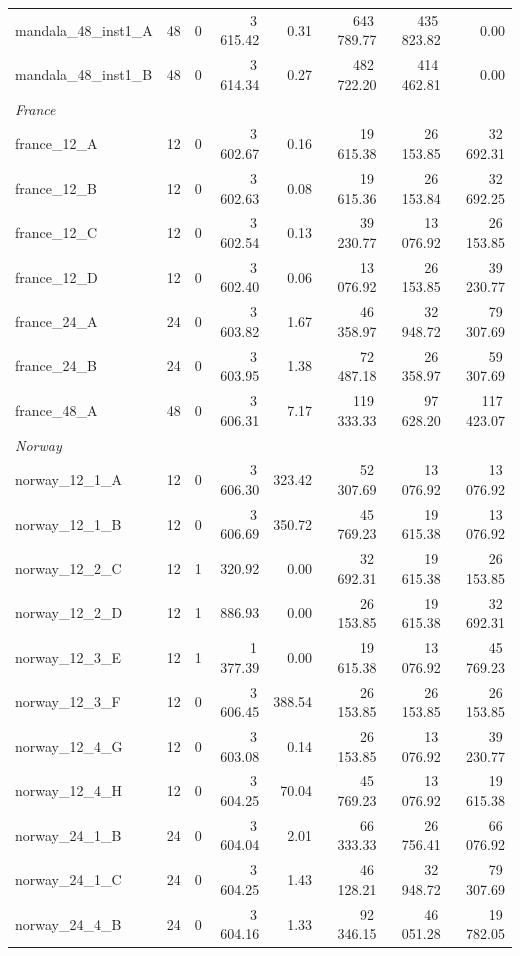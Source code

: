\documentclass{article}
\begin{document}
\begin{table}[h!]
\begin{tabular}{@{}l r c r r r r r@{}}
mandala\_48\_inst1\_A & 48 & 0 & 3\,615.42 & 0.31 & 643\,789.77 & 435\,823.82 & 0.00 \\
mandala\_48\_inst1\_B & 48 & 0 & 3\,614.34 & 0.27 & 482\,722.20 & 414\,462.81 & 0.00 \\
\midrule
\multicolumn{8}{l}{\textit{France}} \\
\midrule
france\_12\_A & 12 & 0 & 3\,602.67 & 0.16 & 19\,615.38 & 26\,153.85 & 32\,692.31 \\
france\_12\_B & 12 & 0 & 3\,602.63 & 0.08 & 19\,615.36 & 26\,153.84 & 32\,692.25 \\
france\_12\_C & 12 & 0 & 3\,602.54 & 0.13 & 39\,230.77 & 13\,076.92 & 26\,153.85 \\
france\_12\_D & 12 & 0 & 3\,602.40 & 0.06 & 13\,076.92 & 26\,153.85 & 39\,230.77 \\
france\_24\_A & 24 & 0 & 3\,603.82 & 1.67 & 46\,358.97 & 32\,948.72 & 79\,307.69 \\
france\_24\_B & 24 & 0 & 3\,603.95 & 1.38 & 72\,487.18 & 26\,358.97 & 59\,307.69 \\
france\_48\_A & 48 & 0 & 3\,606.31 & 7.17 & 119\,333.33 & 97\,628.20 & 117\,423.07 \\
\midrule
\multicolumn{8}{l}{\textit{Norway}} \\
\midrule
norway\_12\_1\_A & 12 & 0 & 3\,606.30 & 323.42 & 52\,307.69 & 13\,076.92 & 13\,076.92 \\
norway\_12\_1\_B & 12 & 0 & 3\,606.69 & 350.72 & 45\,769.23 & 19\,615.38 & 13\,076.92 \\
norway\_12\_2\_C & 12 & 1 & 320.92 & 0.00 & 32\,692.31 & 19\,615.38 & 26\,153.85 \\
norway\_12\_2\_D & 12 & 1 & 886.93 & 0.00 & 26\,153.85 & 19\,615.38 & 32\,692.31 \\
norway\_12\_3\_E & 12 & 1 & 1\,377.39 & 0.00 & 19\,615.38 & 13\,076.92 & 45\,769.23 \\
norway\_12\_3\_F & 12 & 0 & 3\,606.45 & 388.54 & 26\,153.85 & 26\,153.85 & 26\,153.85 \\
norway\_12\_4\_G & 12 & 0 & 3\,603.08 & 0.14 & 26\,153.85 & 13\,076.92 & 39\,230.77 \\
norway\_12\_4\_H & 12 & 0 & 3\,604.25 & 70.04 & 45\,769.23 & 13\,076.92 & 19\,615.38 \\
norway\_24\_1\_B & 24 & 0 & 3\,604.04 & 2.01 & 66\,333.33 & 26\,756.41 & 66\,076.92 \\
norway\_24\_1\_C & 24 & 0 & 3\,604.25 & 1.43 & 46\,128.21 & 32\,948.72 & 79\,307.69 \\
norway\_24\_4\_B & 24 & 0 & 3\,604.16 & 1.33 & 92\,346.15 & 46\,051.28 & 19\,782.05 \\

\end{tabular}
\end{table}
\end{document}
